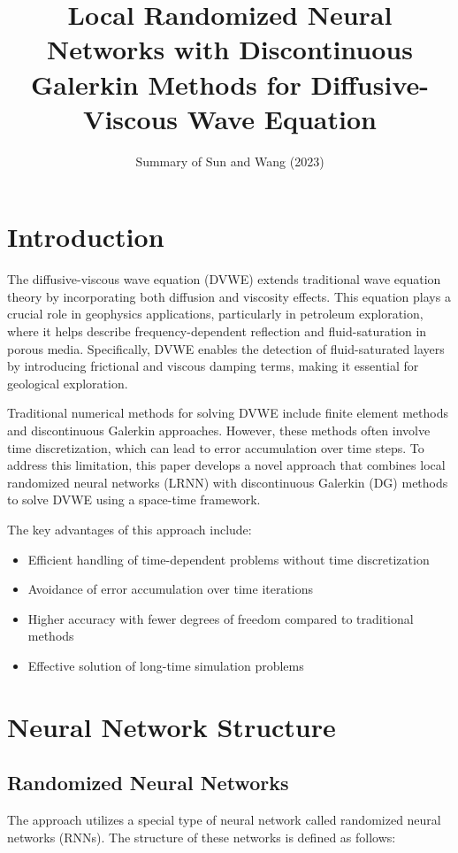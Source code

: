 \documentclass[11pt,a4paper]{article}
\title{Local Randomized Neural Networks with Discontinuous Galerkin Methods for Diffusive-Viscous Wave Equation}
\author{Summary of Sun and Wang (2023)}
\date{}
\begin{document}
\maketitle

\section{Introduction}

The diffusive-viscous wave equation (DVWE) extends traditional wave equation theory by incorporating both diffusion and viscosity effects. This equation plays a crucial role in geophysics applications, particularly in petroleum exploration, where it helps describe frequency-dependent reflection and fluid-saturation in porous media. Specifically, DVWE enables the detection of fluid-saturated layers by introducing frictional and viscous damping terms, making it essential for geological exploration.

Traditional numerical methods for solving DVWE include finite element methods and discontinuous Galerkin approaches. However, these methods often involve time discretization, which can lead to error accumulation over time steps. To address this limitation, this paper develops a novel approach that combines local randomized neural networks (LRNN) with discontinuous Galerkin (DG) methods to solve DVWE using a space-time framework.

The key advantages of this approach include:
\begin{itemize}
    \item Efficient handling of time-dependent problems without time discretization
    \item Avoidance of error accumulation over time iterations
    \item Higher accuracy with fewer degrees of freedom compared to traditional methods
    \item Effective solution of long-time simulation problems
\end{itemize}

\section{Neural Network Structure}

\subsection{Randomized Neural Networks}

The approach utilizes a special type of neural network called randomized neural networks (RNNs). The structure of these networks is defined as follows:
\end{document}
